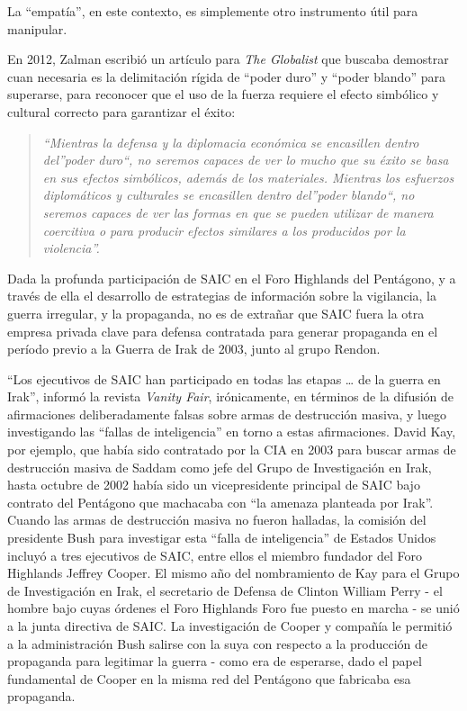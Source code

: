 \documentclass[10pt,a5paper,twoside,spanish,]{book}
\begin{document}
La ``empatía'', en este contexto, es simplemente otro instrumento útil
para manipular.

En 2012, Zalman escribió un artículo para \emph{The Globalist} que
buscaba demostrar cuan necesaria es la delimitación rígida de ``poder
duro'' y ``poder blando'' para superarse, para reconocer que el uso de
la fuerza requiere el efecto simbólico y cultural correcto para
garantizar el éxito:

\begin{quote}
\emph{``Mientras la defensa y la diplomacia económica se encasillen
dentro del''poder duro``, no seremos capaces de ver lo mucho que su
éxito se basa en sus efectos simbólicos, además de los materiales.
Mientras los esfuerzos diplomáticos y culturales se encasillen dentro
del''poder blando``, no seremos capaces de ver las formas en que se
pueden utilizar de manera coercitiva o para producir efectos similares a
los producidos por la violencia''.}
\end{quote}

Dada la profunda participación de SAIC en el Foro Highlands del
Pentágono, y a través de ella el desarrollo de estrategias de
información sobre la vigilancia, la guerra irregular, y la propaganda,
no es de extrañar que SAIC fuera la otra empresa privada clave para
defensa contratada para generar propaganda en el período previo a la
Guerra de Irak de 2003, junto al grupo Rendon.

``Los ejecutivos de SAIC han participado en todas las etapas \ldots{} de
la guerra en Irak'', informó la revista \emph{Vanity Fair},
irónicamente, en términos de la difusión de afirmaciones deliberadamente
falsas sobre armas de destrucción masiva, y luego investigando las
``fallas de inteligencia'' en torno a estas afirmaciones. David Kay, por
ejemplo, que había sido contratado por la CIA en 2003 para buscar armas
de destrucción masiva de Saddam como jefe del Grupo de Investigación en
Irak, hasta octubre de 2002 había sido un vicepresidente principal de
SAIC bajo contrato del Pentágono que machacaba con ``la amenaza
planteada por Irak''. Cuando las armas de destrucción masiva no fueron
halladas, la comisión del presidente Bush para investigar esta ``falla
de inteligencia'' de Estados Unidos incluyó a tres ejecutivos de SAIC,
entre ellos el miembro fundador del Foro Highlands Jeffrey Cooper. El
mismo año del nombramiento de Kay para el Grupo de Investigación en
Irak, el secretario de Defensa de Clinton William Perry - el hombre bajo
cuyas órdenes el Foro Highlands Foro fue puesto en marcha - se unió a la
junta directiva de SAIC. La investigación de Cooper y compañía le
permitió a la administración Bush salirse con la suya con respecto a la
producción de propaganda para legitimar la guerra - como era de
esperarse, dado el papel fundamental de Cooper en la misma red del
Pentágono que fabricaba esa propaganda.
\end{document}
